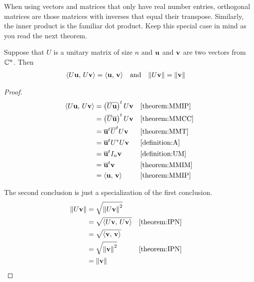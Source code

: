 \documentclass{ximera}
\begin{document}
When using vectors and matrices that only have real number entries,
orthogonal matrices are those matrices with inverses that equal their
transpose.  Similarly, the inner product is the familiar dot product.
Keep this special case in mind as you read the next theorem.

\begin{theorem}
  \label{theorem:UMPIP}

  Suppose that $U$ is a unitary matrix of size $n$ and $\mathbf{u}$ and $\mathbf{v}$ are two vectors from $\mathbb{C}^{n}$.  Then
  \begin{align*}
    \left\langle U\mathbf{u},\,U\mathbf{v}\right\rangle&=\left\langle\mathbf{u},\,\mathbf{v}\right\rangle
    &
    &\text{and}
    &
      \left\lVert U\mathbf{v}\right\rVert&=\left\lVert\mathbf{v}\right\rVert
  \end{align*}

  \begin{proof}
    \begin{align*}
      \left\langle U\mathbf{u},\,U\mathbf{v}\right\rangle
      &=\left(\overline{U\mathbf{u}}\right)^{t}U\mathbf{v}
      &&\ref{theorem:MMIP}\\
      &=\left(\overline{U}\overline{\mathbf{u}}\right)^{t}U\mathbf{v}
      &&\ref{theorem:MMCC}\\
      &=\overline{\mathbf{u}}^{t}\overline{U}^{t}U\mathbf{v}
      &&\ref{theorem:MMT}\\
      &=\overline{\mathbf{u}}^{t}U^\ast U\mathbf{v}
      &&\ref{definition:A}\\
      &=\overline{\mathbf{u}}^{t}I_n\mathbf{v}
      &&\ref{definition:UM}\\
      &=\overline{\mathbf{u}}^{t}\mathbf{v}
      &&\ref{theorem:MMIM}\\
      &=\left\langle\mathbf{u},\,\mathbf{v}\right\rangle
      &&\ref{theorem:MMIP}
    \end{align*}
    
    The second conclusion is just a specialization of the first conclusion.
    \begin{align*}
      \left\lVert U\mathbf{v}\right\rVert
      &=\sqrt{\left\lVert U\mathbf{v}\right\rVert^2}\\
      &=\sqrt{\left\langle U\mathbf{v},\,U\mathbf{v}\right\rangle}&&\ref{theorem:IPN}\\
      &=\sqrt{\left\langle\mathbf{v},\,\mathbf{v}\right\rangle}\\
      &=\sqrt{\left\lVert\mathbf{v}\right\rVert^2}&&\ref{theorem:IPN}\\
      &=\left\lVert\mathbf{v}\right\rVert
    \end{align*}
    
  \end{proof}
\end{theorem}
\end{document}
